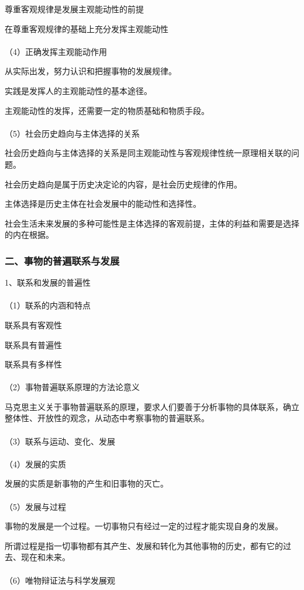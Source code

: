 \documentclass{ctexart}
\begin{document}
尊重客观规律是发展主观能动性的前提

在尊重客观规律的基础上充分发挥主观能动性
\\\\
（4）正确发挥主观能动作用

从实际出发，努力认识和把握事物的发展规律。

实践是发挥人的主观能动性的基本途径。

主观能动性的发挥，还需要一定的物质基础和物质手段。
\\\\
（5）社会历史趋向与主体选择的关系

社会历史趋向与主体选择的关系是同主观能动性与客观规律性统一原理相关联的问题。

社会历史趋向是属于历史决定论的内容，是社会历史规律的作用。

主体选择是历史主体在社会发展中的能动性和选择性。

社会生活未来发展的多种可能性是主体选择的客观前提，主体的利益和需要是选择的内在根据。

\subsubsection{二、事物的普遍联系与发展}
1、联系和发展的普遍性
\\\\
（1）联系的内涵和特点

联系具有客观性

联系具有普遍性

联系具有多样性
\\\\
（2）事物普遍联系原理的方法论意义

马克思主义关于事物普遍联系的原理，要求人们要善于分析事物的具体联系，确立整体性、开放性的观念，从动态中考察事物的普遍联系。
\\\\
（3）联系与运动、变化、发展
\\\\
（4）发展的实质

发展的实质是新事物的产生和旧事物的灭亡。
\\\\
（5）发展与过程

事物的发展是一个过程。一切事物只有经过一定的过程才能实现自身的发展。

所谓过程是指一切事物都有其产生、发展和转化为其他事物的历史，都有它的过去、现在和未来。
\\\\
（6）唯物辩证法与科学发展观
\end{document}
